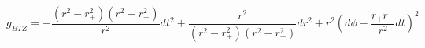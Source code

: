 \begin{equation}
g_{BTZ}= -\frac{(r^2-r_{+}^2)(r^2-r_{-}^2)}{r^2}dt^2
+\frac{r^2}{(r^2-r_{+}^2)(r^2-r_{-}^2)}dr^2 + r^2(d\phi -
\frac{r_{+}r_{-}}{r^2}dt)^2
\end{equation}

